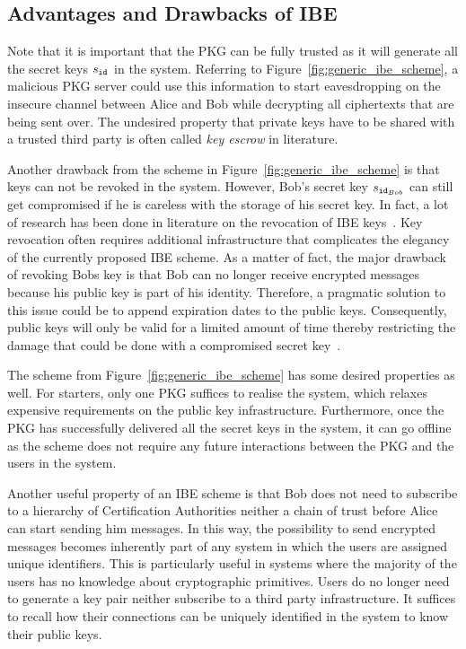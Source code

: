 \subsection{Advantages and Drawbacks of IBE}
Note that it is important that the PKG can be fully trusted as it will generate all the secret keys $s_{\mathtt{id}_{}}$ in the system. Referring to Figure~\ref{fig:generic_ibe_scheme}, a malicious PKG server could use this information to start eavesdropping on the insecure channel between Alice and Bob while decrypting all ciphertexts that are being sent over. The undesired property that private keys have to be shared with a trusted third party is often called \textit{key escrow} in literature.

Another drawback from the scheme in Figure~\ref{fig:generic_ibe_scheme} is that keys can not be revoked in the system. However, Bob's secret key $s_{\mathtt{id}_{Bob}}$ can still get compromised if he is careless with the storage of his secret key. In fact, a lot of research has been done in literature on the revocation of IBE keys~\cite{art:BoldyrevaGK12,art:BonehDTW01,art:HanaokaHSI05,art:LibertQ03}. Key revocation often requires additional infrastructure that complicates the elegancy of the currently proposed IBE scheme. As a matter of fact, the major drawback of revoking Bobs key is that Bob can no longer receive encrypted messages because his public key is part of his identity. Therefore, a pragmatic solution to this issue could be to append expiration dates to the public keys. Consequently, public keys will only be valid for a limited amount of time thereby restricting the damage that could be done with a compromised secret key~\cite{art:BonehF01}.

The scheme from Figure~\ref{fig:generic_ibe_scheme} has some desired properties as well. For starters, only one PKG suffices to realise the system, which relaxes expensive requirements on the public key infrastructure. Furthermore, once the PKG has successfully delivered all the secret keys in the system, it can go offline as the scheme does not require any future interactions between the PKG and the users in the system.

Another useful property of an IBE scheme is that Bob does not need to subscribe to a hierarchy of Certification Authorities neither a chain of trust before Alice can start sending him messages. In this way, the possibility to send encrypted messages becomes inherently part of any system in which the users are assigned unique identifiers. This is particularly useful in systems where the majority of the users has no knowledge about cryptographic primitives.  Users do no longer need to generate a key pair neither subscribe to a third party infrastructure. It suffices to recall how their connections can be uniquely identified in the system to know their public keys.


